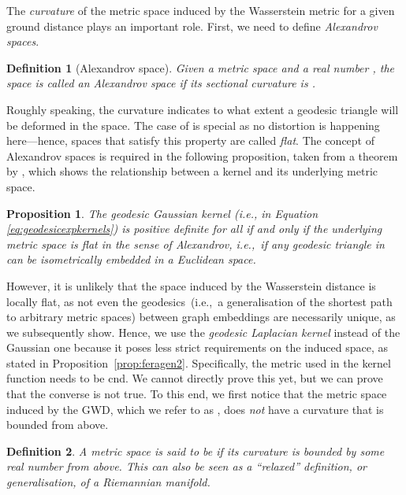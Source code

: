 \documentclass{article}
\newtheorem{definition}{Definition}
\newtheorem{proposition}{Proposition}
\begin{document}
The \emph{curvature} of the metric space induced by the Wasserstein metric for a given ground distance plays an important role. First, we need to define \emph{Alexandrov spaces}.
\begin{definition}[Alexandrov space]
    Given a metric space and a real number , the space is called an Alexandrov space if its sectional curvature is .
\end{definition}
Roughly speaking, the curvature indicates to what extent a geodesic triangle will be deformed in the space. The case of  is special as no distortion is happening here---hence, spaces that satisfy this property are called \emph{flat}. The concept of Alexandrov spaces is required in the following proposition, taken from a theorem by \citet{feragen2015geodesic}, which shows the relationship between a kernel and its underlying metric space.
\begin{proposition}
\label{prop:feragen}
The geodesic Gaussian kernel (i.e.,  in Equation \ref{eq:geodesicexpkernels}) is positive definite for all  if and only if the underlying metric space  is flat in the sense of Alexandrov, i.e.,\ if any geodesic triangle in  can be isometrically embedded in a Euclidean space.
\end{proposition}
However, it is unlikely that the space induced by the Wasserstein distance is locally flat, as not even the geodesics~(i.e.,\ a generalisation of the shortest path to arbitrary metric spaces) between graph embeddings are necessarily unique, as we subsequently show. Hence,
we use the \emph{geodesic Laplacian kernel} instead of the Gaussian one because it poses less strict requirements on the induced space, as stated in Proposition~\ref{prop:feragen2}. Specifically, the metric used in the kernel function needs to be cnd. We cannot directly prove this yet, but we can prove that the converse is not true. To this end, we first notice that the metric space induced by the GWD, which we refer to as , does \emph{not} have a curvature that is bounded from above.

\begin{definition}
A metric space  is said to be  if its curvature is bounded by some real number  from above. This can also be seen as a ``relaxed'' definition, or generalisation, of a Riemannian manifold.
\end{definition}
\end{document}
